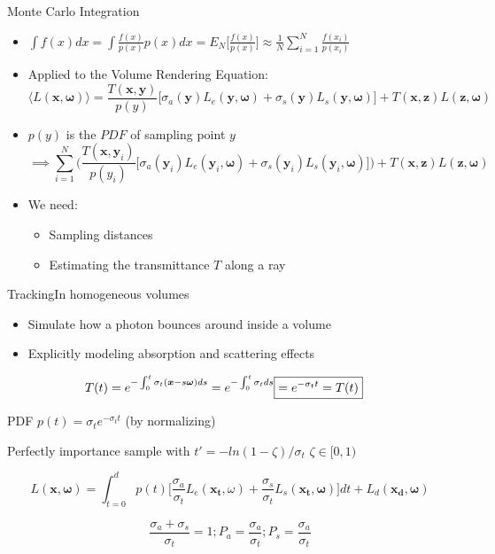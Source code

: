 \documentclass[
  english,            %
  aspectratio=169,    %
]{tumbeamer}
\newcommand\bx[0]{\bm{x}}
\newcommand\by[0]{\bm{y}}
\newcommand\bomega[0]{\bm{\omega}}
\begin{document}
\begin{frame}{Monte Carlo Integration}
\begin{itemize}
    \item $\int f(x)dx = \int \frac{f(x)}{p(x)}p(x) dx 
        = E_N\Big[ \frac{f(x)}{p(x)} \Big]
        \approx \frac{1}{N} \sum\limits_{i=1}^N \frac{f(x_i)}{p(x_i)}$
    \item Applied to the Volume Rendering Equation:
    $$\langle L(\bx, \bomega) \rangle = 
        \frac{T(\bx, \by)}{p(y)}
        \big[ 
            \sigma_a(\by)L_e(\by, \bomega) + 
            \sigma_s(\by)L_s(\by, \bomega)
        \big] 
        + 
        T(\bx, \textbf{z})L(\textbf{z},\bomega)$$
    \item $p(y)$ is the $PDF$ of sampling point $y$
        $$\implies
         \sum\limits_{i=1}^N \Big(
        \frac{T(\bx, \by_i)}{p(y_i)}
        \big[ 
            \sigma_a(\by_i)L_e(\by_i, \bomega) + 
            \sigma_s(\by_i)L_s(\by_i, \bomega)
        \big] \Big)
        + 
        T(\bx, \textbf{z})L(\textbf{z},\bomega)
        $$
    \item We need:
        \begin{itemize}
            \item Sampling distances
            \item Estimating the transmittance $T$ along a ray
        \end{itemize}
\end{itemize}
\end{frame}

\begin{frame}{Tracking}{In homogeneous volumes}
    \begin{itemize}
        \item Simulate how a photon bounces around inside a volume
        \item Explicitly modeling absorption and scattering effects
    \end{itemize}
\begin{align}
    T(t) = e^{-\int_0^t \sigma_t(\bx-s\bomega)ds} = e^{-\int_0^t \sigma_t ds} 
    \Aboxed{= e^{-\sigma_t t} = T(t)}
\end{align}

PDF $p(t) = \sigma_t e^{-\sigma_t t}$ (by normalizing) 

Perfectly importance sample with $t' = -ln(1-\zeta)/\sigma_t$ 
\hfill $\zeta \in [0,1)$

\begin{equation}
    L(\bm{x}, \bm{\omega}) = \int_{t=0}^{d} p(t) 
    \Big[ \frac{\sigma_a}{\sigma_t} L_e(\bm{x_t}, \omega)
    + \frac{\sigma_s}{\sigma_t} L_s(\bm{x_t}, \bomega)
    \Big]dt + L_d(\bm{x_d}, \bm{\omega})
\end{equation}

\begin{equation}
    \frac{\sigma_a + \sigma_s}{\sigma_t} = 1;
  P_a = \frac{\sigma_a}{\sigma_t}; P_s = \frac{\sigma_a}{\sigma_t}
\end{equation}

\end{frame}
\end{document}
